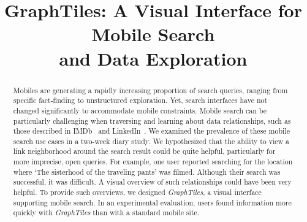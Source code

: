 \documentclass{sigchi}
\begin{document}
\title{GraphTiles: A Visual Interface for Mobile Search \\ and Data Exploration}
%


\maketitle

\toappear

\begin{abstract}
Mobiles are generating a rapidly increasing proportion of search queries, ranging from specific fact-finding to unstructured exploration. Yet, search interfaces have not changed significantly to accommodate mobile constraints. Mobile search can be particularly challenging when traversing and learning about data relationships, such as those described in IMDb~\cite{imdb} and LinkedIn~\cite{linkedin}. We examined the prevalence of these mobile search use cases in a two-week diary study. We hypothesized that the ability to view a link neighborhood around the search result could be quite helpful, particularly for more imprecise, open queries. For example, one user reported searching for the location where `The sisterhood of the traveling pants' was filmed. Although their search was successful, it was difficult. A visual overview of such relationships could have been very helpful. To provide such overviews, we designed \textit{GraphTiles}, a visual interface supporting mobile search. In an experimental evaluation, users found information more quickly with \textit{GraphTiles} than with a standard mobile site.

\end{abstract}
\end{document}
